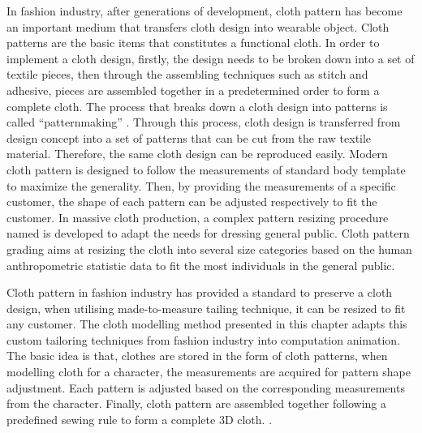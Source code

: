 In fashion industry, after generations of development, cloth pattern has become an important medium that transfers cloth design into wearable object. Cloth patterns are the basic items that constitutes a functional cloth. In order to implement a cloth design, firstly, the design needs to be broken down into a set of textile pieces, then through the assembling techniques such as stitch and adhesive, pieces are assembled together in a predetermined order to form a complete cloth. The process that breaks down a cloth design into patterns is called ``patternmaking'' . Through this process, cloth design is transferred from design concept into a set of patterns that can be cut from the raw textile material. Therefore, the same cloth design can be reproduced easily. Modern cloth pattern is designed to follow the measurements of standard body template to maximize the generality. Then, by providing the measurements of a specific customer, the shape of each pattern can be adjusted respectively to fit the customer. In massive cloth production, a complex pattern resizing procedure named is developed to adapt the needs for dressing general public. Cloth pattern grading aims at resizing the cloth into several size categories based on the human anthropometric statistic data to fit the most individuals in the general public. 

Cloth pattern in fashion industry has provided a standard to preserve a cloth design, when utilising made-to-measure tailing technique, it can be resized to fit any customer. The cloth modelling method presented in this chapter adapts this custom tailoring techniques from fashion industry into computation animation. The basic idea is that, clothes are stored in the form of cloth patterns, when modelling cloth for a character, the measurements are acquired for pattern shape adjustment. Each pattern is adjusted based on the corresponding measurements from the character. Finally, cloth pattern are assembled together following a predefined sewing rule to form a complete 3D cloth. .


